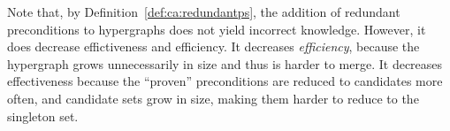 \documentclass[../Master.tex]{subfiles}
\begin{document}
Note that, by Definition~\ref{def:ca:redundantps}, the addition of redundant preconditions to hypergraphs does not yield incorrect knowledge. However, it does decrease effictiveness and efficiency. It decreases \textit{efficiency}, because the hypergraph grows unnecessarily in size and thus is harder to merge. It decreases effectiveness because the ``proven'' preconditions are reduced to candidates more often, and candidate sets grow in size, making them harder to reduce to the singleton set.
\end{document}
